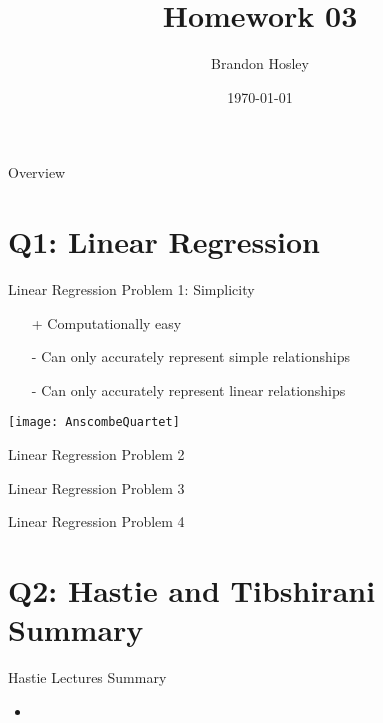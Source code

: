 \documentclass{beamer}
\title{Homework 03}
\author{Brandon Hosley}
\institute{University of Illinois - Springfield}
\date{\today}
\begin{document}
\frame{\titlepage}

\begin{frame}{Overview}
\tableofcontents
\end{frame}

\section[Q1]{Q1: Linear Regression}

\begin{frame}{Linear Regression Problem 1: Simplicity}
	\begin{itemize}
		\item[+] Computationally easy
		\item[-] Can only accurately represent simple relationships
		\item[-] Can only accurately represent linear relationships
	\end{itemize}
	\texttt{[image: AnscombeQuartet]}
\end{frame}

\begin{frame}{Linear Regression Problem 2}
\end{frame}

\begin{frame}{Linear Regression Problem 3}
\end{frame}

\begin{frame}{Linear Regression Problem 4}
\end{frame}

\section[Q2]{Q2: Hastie and Tibshirani Summary}

\begin{frame}{Hastie Lectures Summary}
	\begin{itemize}
		\item 
	\end{itemize}
\end{frame}


\end{document}
